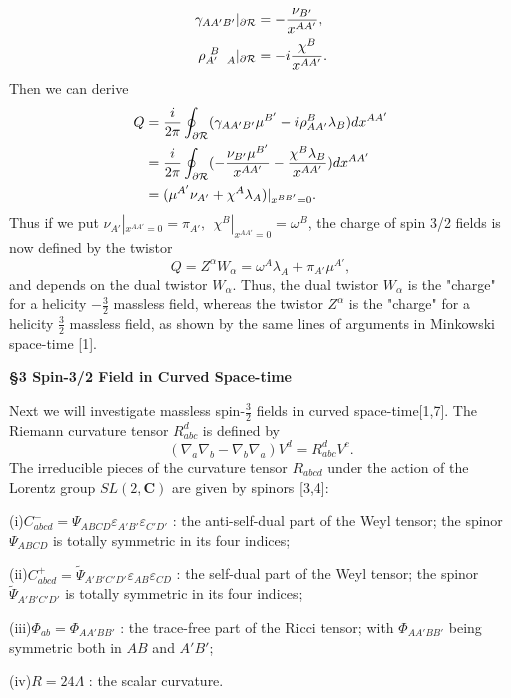 \documentclass[a4paper,12pt]{article}
\begin{document}
\begin{align*}
\gamma_{AA'B'}|_{\partial{\cal R}}&=-\frac{\nu_{B'}}{x^{AA'}},\\
\rho_{A'\ \ A}^{\ B}|_{\partial{\cal R}}&=-i\frac{\chi^B}{x^{AA'}}. 
\end{align*} 
Then we can derive
\begin{equation}
\begin{split}
Q&=\frac{i}{2\pi}\oint_{\partial{\cal R}}(\gamma_{AA'B'}\mu^{B'}-i\rho_{AA'}^B\lambda_B)dx^{AA'}\\ 
&=\frac{i}{2\pi}\oint_{\partial{\cal R}}(-\frac{\nu_{B'}\mu^{B'}}{x^{AA'}}-\frac{\chi^B\lambda_B}{x^{AA'}})dx^{AA'}\\ 
&=(\mu^{A'}\nu_{A'}+\chi^A\lambda_A)|_{x^{BB'}=0}.
\end{split}
\end{equation}
Thus if we put $\nu_{A'}|_{x^{AA'}=0}=\pi_{A'},\ \ \chi^B|_{x^{AA'}=0}=\omega^B$, the charge of spin 3/2 fields is now defined by the twistor
\begin{equation}
Q=Z^\alpha W_\alpha=\omega^A\lambda_A+\pi_{A'}\mu^{A'},
\end{equation}
and depends on the dual twistor $W_\alpha$.
Thus, the dual twistor $W_\alpha$ is the "charge" for a helicity $-\frac{3}{2}$ massless field, whereas the twistor $Z^\alpha$ is the "charge" for a helicity $\frac{3}{2}$ massless field, as shown by the same lines of arguments in Minkowski space-time [1].

\vskip 16pt
{\bf \S 3 Spin-3/2 Field in Curved Space-time}
\vskip 16pt

Next we will investigate massless spin-$\frac{3}{2}$ fields in curved space-time[1,7].
The Riemann curvature tensor $R_{abc}^d$ is defined by
\begin{equation}
(\nabla_a\nabla_b-\nabla_b\nabla_a)V^d=R_{abc}^dV^c. 
\end{equation}
The irreducible pieces of the curvature tensor $R_{abcd}$ under the action of the Lorentz group $SL(2,\mathbf{C})$ are given by spinors [3,4]:\par

(i)$C^{-}_{abcd}  =  \Psi_{ABCD}\varepsilon_{A'B'}\varepsilon_{C'D'}$ : the anti-self-dual part of the Weyl tensor; the spinor $\Psi_{ABCD}$ is totally symmetric in its four indices;\par
(ii)$C^{+}_{abcd}  =  \tilde\Psi_{A'B'C'D'}\varepsilon_{AB}\varepsilon_{CD}$ : the self-dual part of the Weyl tensor; the spinor $\tilde\Psi_{A'B'C'D'}$ is totally symmetric in its four indices;\par
(iii)$\Phi_{ab}  =  \Phi_{AA'BB'}$ : the trace-free part of the Ricci tensor; with $\Phi_{AA'BB'}$ being symmetric both in $AB$ and $A'B'$;\par
(iv)$R = 24\Lambda$ : the scalar curvature.\par
\end{document}
